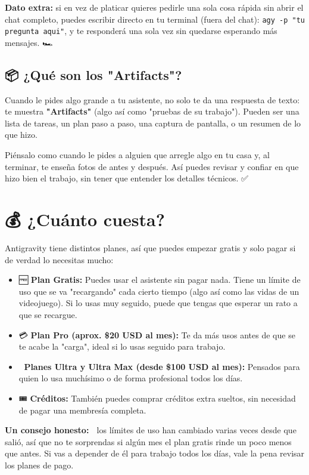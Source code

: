 \documentclass[12pt]{article}
\begin{document}
\textbf{Dato extra:} si en vez de platicar quieres pedirle una sola cosa rápida sin abrir el chat completo, puedes escribir directo en tu terminal (fuera del chat): \texttt{agy -p "tu pregunta aqui"}, y te responderá una sola vez sin quedarse esperando más mensajes. 🏎️

\subsection{📦 ¿Qué son los "Artifacts"?}
Cuando le pides algo grande a tu asistente, no solo te da una respuesta de texto: te muestra \textbf{"Artifacts"} (algo así como "pruebas de su trabajo"). Pueden ser una lista de tareas, un plan paso a paso, una captura de pantalla, o un resumen de lo que hizo. 🧾

Piénsalo como cuando le pides a alguien que arregle algo en tu casa y, al terminar, te enseña fotos de antes y después. Así puedes revisar y confiar en que hizo bien el trabajo, sin tener que entender los detalles técnicos. ✅

\newpage
\section{💰 ¿Cuánto cuesta?}
Antigravity tiene distintos planes, así que puedes empezar gratis y solo pagar si de verdad lo necesitas mucho:

\begin{itemize}
    \item 🆓 \textbf{Plan Gratis:} Puedes usar el asistente sin pagar nada. Tiene un límite de uso que se va "recargando" cada cierto tiempo (algo así como las vidas de un videojuego). Si lo usas muy seguido, puede que tengas que esperar un rato a que se recargue.
    \item 💳 \textbf{Plan Pro (aprox. \$20 USD al mes):} Te da más usos antes de que se te acabe la "carga", ideal si lo usas seguido para trabajo.
    \item 💎 \textbf{Planes Ultra y Ultra Max (desde \$100 USD al mes):} Pensados para quien lo usa muchísimo o de forma profesional todos los días.
    \item 🎟️ \textbf{Créditos:} También puedes comprar créditos extra sueltos, sin necesidad de pagar una membresía completa.
\end{itemize}

\textbf{Un consejo honesto:} 🤗 los límites de uso han cambiado varias veces desde que salió, así que no te sorprendas si algún mes el plan gratis rinde un poco menos que antes. Si vas a depender de él para trabajo todos los días, vale la pena revisar los planes de pago.
\end{document}
